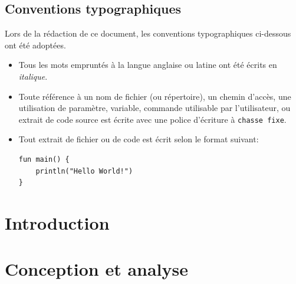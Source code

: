 \documentclass[a4paper, 12pt]{article}
\newenvironment{code}{\captionsetup{type=listing}}{}
\begin{document}
\subsection*{Conventions typographiques} %
Lors de la rédaction de ce document, les conventions typographiques ci-dessous ont
été adoptées.
\begin{itemize}[label=\textbullet]
	\item Tous les mots empruntés à la langue anglaise ou latine ont été écrits en \textit{italique}.
	\item Toute référence à un nom de fichier (ou répertoire), un chemin d'accès, une 
    utilisation de paramètre, variable, commande utilisable par l'utilisateur, ou extrait de code 
    source est écrite avec une police d'écriture à \texttt{chasse fixe}.
	\item Tout extrait de fichier ou de code est écrit selon le format suivant:
    \begin{code}
        \begin{verbatim}
fun main() {
    println("Hello World!")
}
        \end{verbatim}
    \end{code}
\end{itemize}


\printglossary[type=\acronymtype,title={Acronymes}]
\newpage


\section{Introduction} %

\newpage

\section{Conception et analyse} %

\newpage
\end{document}
